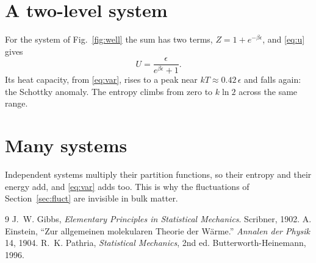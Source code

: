 \documentclass[11pt]{article}
\begin{document}
\newpage
\section{A two-level system}\label{sec:two}
For the system of Fig.~\ref{fig:well} the sum has two terms,
$Z = 1 + e^{-\beta\epsilon}$, and \eqref{eq:u} gives
\begin{equation}\label{eq:two}
  U = \frac{\epsilon}{e^{\beta\epsilon} + 1}.
\end{equation}
Its heat capacity, from \eqref{eq:var}, rises to a peak near
$kT \approx 0.42\,\epsilon$ and falls again: the Schottky anomaly. The
entropy climbs from zero to $k \ln 2$ across the same range.

\newpage
\section{Many systems}
Independent systems multiply their partition functions, so their
entropy and their energy add, and \eqref{eq:var} adds too. This is why
the fluctuations of Section~\ref{sec:fluct} are invisible in bulk matter.

\begin{thebibliography}{9}
 J.~W. Gibbs, \emph{Elementary Principles in Statistical
Mechanics}. Scribner, 1902.
 A. Einstein, ``Zur allgemeinen molekularen Theorie der
W\"arme.'' \emph{Annalen der Physik} 14, 1904.
 R.~K. Pathria, \emph{Statistical Mechanics}, 2nd ed.
Butterworth-Heinemann, 1996.
\end{thebibliography}
\end{document}
